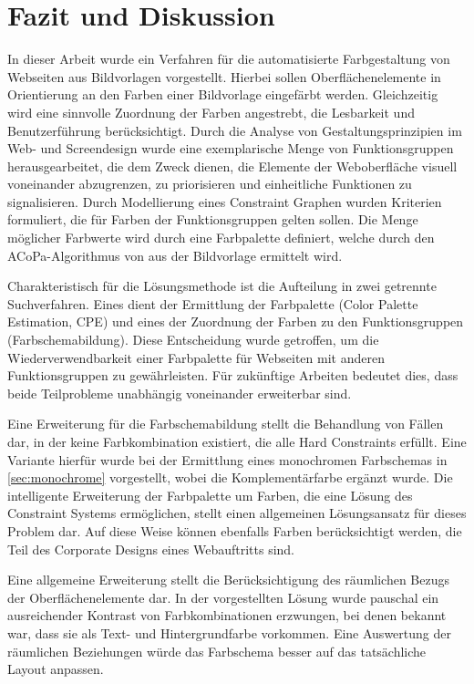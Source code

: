 \section{Fazit und Diskussion}

In dieser Arbeit wurde ein Verfahren für die automatisierte Farbgestaltung von Webseiten aus Bildvorlagen vorgestellt. Hierbei sollen Oberflächenelemente in Orientierung an den Farben einer Bildvorlage eingefärbt werden. Gleichzeitig wird eine sinnvolle Zuordnung der Farben angestrebt, die Lesbarkeit und Benutzerführung berücksichtigt. Durch die Analyse von Gestaltungsprinzipien im Web- und Screendesign wurde eine exemplarische Menge von Funktionsgruppen herausgearbeitet, die dem Zweck dienen, die Elemente der Weboberfläche visuell voneinander abzugrenzen, zu priorisieren und einheitliche Funktionen zu signalisieren. Durch Modellierung eines Constraint Graphen wurden Kriterien formuliert, die für Farben der Funktionsgruppen gelten sollen. Die Menge möglicher Farbwerte wird durch eine Farbpalette definiert, welche durch den ACoPa-Algorithmus von \citet{acopa} aus der Bildvorlage ermittelt wird.

Charakteristisch für die Lösungsmethode ist die Aufteilung in zwei getrennte Suchverfahren. Eines dient der Ermittlung der Farbpalette (Color Palette Estimation, CPE) und eines der Zuordnung der Farben zu den Funktionsgruppen (Farbschemabildung). Diese Entscheidung wurde getroffen, um die Wiederverwendbarkeit einer Farbpalette für Webseiten mit anderen Funktionsgruppen zu gewährleisten. Für zukünftige Arbeiten bedeutet dies, dass beide Teilprobleme unabhängig voneinander erweiterbar sind.

Eine Erweiterung für die Farbschemabildung stellt die Behandlung von Fällen dar, in der keine Farbkombination existiert, die alle Hard Constraints erfüllt. Eine Variante hierfür wurde bei der Ermittlung eines monochromen Farbschemas in  \autoref{sec:monochrome} vorgestellt, wobei die Komplementärfarbe ergänzt wurde. Die intelligente Erweiterung der Farbpalette um Farben, die eine Lösung des Constraint Systems ermöglichen, stellt einen allgemeinen Lösungsansatz für dieses Problem dar. Auf diese Weise können ebenfalls Farben berücksichtigt werden, die Teil des Corporate Designs eines Webauftritts sind.

Eine allgemeine Erweiterung stellt die Berücksichtigung des räumlichen Bezugs der Oberflächenelemente dar. In der vorgestellten Lösung wurde pauschal ein ausreichender Kontrast von Farbkombinationen erzwungen, bei denen bekannt war, dass sie als Text- und Hintergrundfarbe vorkommen. Eine Auswertung der räumlichen Beziehungen würde das Farbschema besser auf das tatsächliche Layout anpassen.